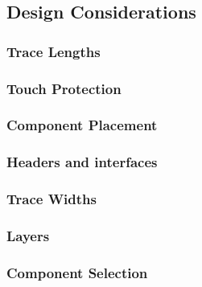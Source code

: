 \subsection{Design Considerations}

\subsubsection{Trace Lengths}
\subsubsection{Touch Protection}
\subsubsection{Component Placement}
\subsubsection{Headers and interfaces}
\subsubsection{Trace Widths}
\subsubsection{Layers}
\subsubsection{Component Selection}